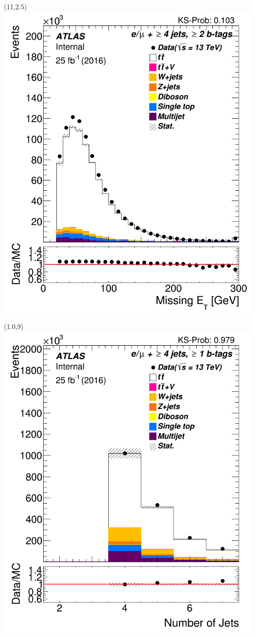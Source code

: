 \documentclass[green,compress,10pt]{beamer}
\begin{document}
{	\begin{textblock}{5}(11,2.5)	
	\includegraphics[width=0.8\linewidth]{PicsTop/MET.jpg}
    \end{textblock}
	
	\begin{textblock}{5}(1.0,9)	
	\includegraphics[width=0.8\linewidth]{PicsTop/1NumberJets.png}
	\end{textblock}
	
}
\end{document}

